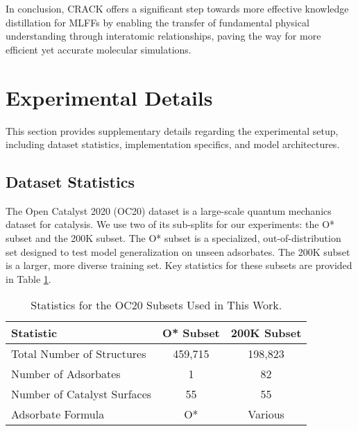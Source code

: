 \documentclass{article}
\begin{document}
In conclusion, CRACK offers a significant step towards more effective knowledge distillation for MLFFs by enabling the transfer of fundamental physical understanding through interatomic relationships, paving the way for more efficient yet accurate molecular simulations.




\appendix

\section{Experimental Details}
This section provides supplementary details regarding the experimental setup, including dataset statistics, implementation specifics, and model architectures.

\subsection{Dataset Statistics}
The Open Catalyst 2020 (OC20) dataset is a large-scale quantum mechanics dataset for catalysis. We use two of its sub-splits for our experiments: the O* subset and the 200K subset. The O* subset is a specialized, out-of-distribution set designed to test model generalization on unseen adsorbates. The 200K subset is a larger, more diverse training set. Key statistics for these subsets are provided in Table \ref{tab:dataset-stats}.

\begin{table}[h]
\centering
\caption{Statistics for the OC20 Subsets Used in This Work.}
\label{tab:dataset-stats}
\begin{adjustbox}{max width=0.8\textwidth}
\begin{tabular}{lcc}
\toprule
\textbf{Statistic} & \textbf{O* Subset} & \textbf{200K Subset} \\
\midrule
Total Number of Structures & 459,715 & 198,823 \\
Number of Adsorbates & 1 & 82 \\
Number of Catalyst Surfaces & 55 & 55 \\
Adsorbate Formula & O* & Various \\
\bottomrule
\end{tabular}
\end{adjustbox}
\end{table}
\end{document}
